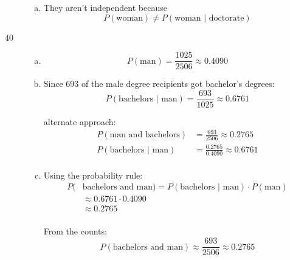 \documentclass[letterpaper, landscape]{exam}
\begin{document}
\begin{description}
\begin{enumerate}[(a)]
          \item They aren't independent because 
            \[
              P(\text {woman}) \neq P( \text{woman } | \text { doctorate} )
            \]

        \end{enumerate}

      \item[40]
        \begin{enumerate}[(a)]
          \item 
            \[
              P(\text{man}) = \frac{1025}{2506} \approx \boxed{ 0.4090 }
            \]

          \item

            Since 693 of the male degree recipients got bachelor's degrees:
            \[
              P( \text{bachelors } | \text { man} ) = \frac{693}{1025} 
                \approx \boxed{ 0.6761 } 
            \]

            alternate approach:
            \begin{align*}
              P( \text{man and bachelors} )         & = \frac{693}{2506} \approx 0.2765 \\
              P( \text{bachelors } | \text { man} ) & = \frac{0.2765}{0.4090}
                \approx 0.6761 \\
            \end{align*}
          \item Using the probability rule:
            \begin{align*}
              P( & \text{bachelors and man}) = 
                P( \text{bachelors } | \text { man} ) \cdot P( \text{man} ) \\
                & \approx 0.6761 \cdot 0.4090  \\
                & \approx \boxed{ 0.2765 }  \\
            \end{align*}

            From the counts:
            \[
              P( \text{bachelors and man}) \approx \frac{693}{2506} \approx 0.2765 
            \]

        \end{enumerate}




\end{description}
\end{document}
